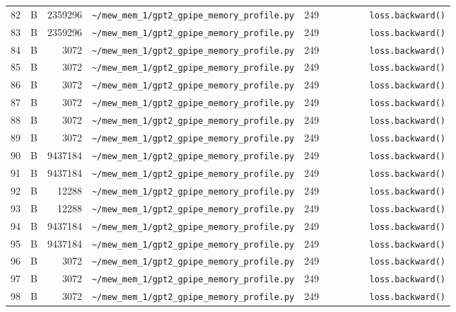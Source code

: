 \documentclass{article}
\begin{document}
\begin{longtable}{r l r p{6.5cm} r p{7.0cm}}
82 & B & 2359296 & \lstinline|~/mew_mem_1/gpt2_gpipe_memory_profile.py| & 249 & \lstinline|        loss.backward()| \\
83 & B & 2359296 & \lstinline|~/mew_mem_1/gpt2_gpipe_memory_profile.py| & 249 & \lstinline|        loss.backward()| \\
84 & B & 3072 & \lstinline|~/mew_mem_1/gpt2_gpipe_memory_profile.py| & 249 & \lstinline|        loss.backward()| \\
85 & B & 3072 & \lstinline|~/mew_mem_1/gpt2_gpipe_memory_profile.py| & 249 & \lstinline|        loss.backward()| \\
86 & B & 3072 & \lstinline|~/mew_mem_1/gpt2_gpipe_memory_profile.py| & 249 & \lstinline|        loss.backward()| \\
87 & B & 3072 & \lstinline|~/mew_mem_1/gpt2_gpipe_memory_profile.py| & 249 & \lstinline|        loss.backward()| \\
88 & B & 3072 & \lstinline|~/mew_mem_1/gpt2_gpipe_memory_profile.py| & 249 & \lstinline|        loss.backward()| \\
89 & B & 3072 & \lstinline|~/mew_mem_1/gpt2_gpipe_memory_profile.py| & 249 & \lstinline|        loss.backward()| \\
90 & B & 9437184 & \lstinline|~/mew_mem_1/gpt2_gpipe_memory_profile.py| & 249 & \lstinline|        loss.backward()| \\
91 & B & 9437184 & \lstinline|~/mew_mem_1/gpt2_gpipe_memory_profile.py| & 249 & \lstinline|        loss.backward()| \\
92 & B & 12288 & \lstinline|~/mew_mem_1/gpt2_gpipe_memory_profile.py| & 249 & \lstinline|        loss.backward()| \\
93 & B & 12288 & \lstinline|~/mew_mem_1/gpt2_gpipe_memory_profile.py| & 249 & \lstinline|        loss.backward()| \\
94 & B & 9437184 & \lstinline|~/mew_mem_1/gpt2_gpipe_memory_profile.py| & 249 & \lstinline|        loss.backward()| \\
95 & B & 9437184 & \lstinline|~/mew_mem_1/gpt2_gpipe_memory_profile.py| & 249 & \lstinline|        loss.backward()| \\
96 & B & 3072 & \lstinline|~/mew_mem_1/gpt2_gpipe_memory_profile.py| & 249 & \lstinline|        loss.backward()| \\
97 & B & 3072 & \lstinline|~/mew_mem_1/gpt2_gpipe_memory_profile.py| & 249 & \lstinline|        loss.backward()| \\
98 & B & 3072 & \lstinline|~/mew_mem_1/gpt2_gpipe_memory_profile.py| & 249 & \lstinline|        loss.backward()| \\

\end{longtable}
\end{document}
